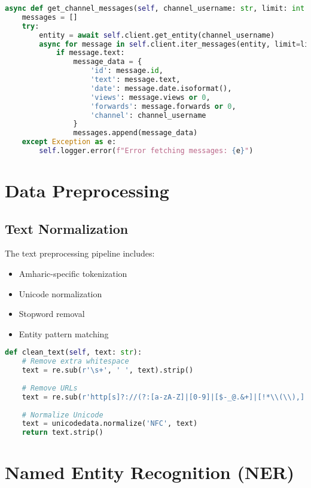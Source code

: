 \documentclass[12pt,a4paper]{article}
\begin{document}
\begin{lstlisting}[language=Python, caption=Telegram Scraper Implementation]
async def get_channel_messages(self, channel_username: str, limit: int = 1000):
    messages = []
    try:
        entity = await self.client.get_entity(channel_username)
        async for message in self.client.iter_messages(entity, limit=limit):
            if message.text:
                message_data = {
                    'id': message.id,
                    'text': message.text,
                    'date': message.date.isoformat(),
                    'views': message.views or 0,
                    'forwards': message.forwards or 0,
                    'channel': channel_username
                }
                messages.append(message_data)
    except Exception as e:
        self.logger.error(f"Error fetching messages: {e}")
\end{lstlisting}

\section{Data Preprocessing}

\subsection{Text Normalization}
The text preprocessing pipeline includes:
\begin{itemize}
    \item Amharic-specific tokenization
    \item Unicode normalization
    \item Stopword removal
    \item Entity pattern matching
\end{itemize}

\begin{lstlisting}[language=Python, caption=Text Preprocessing]
def clean_text(self, text: str):
    # Remove extra whitespace
    text = re.sub(r'\s+', ' ', text).strip()
    
    # Remove URLs
    text = re.sub(r'http[s]?://(?:[a-zA-Z]|[0-9]|[$-_@.&+]|[!*\\(\\),]|(?:%[0-9a-fA-F][0-9a-fA-F]))+', '', text)
    
    # Normalize Unicode
    text = unicodedata.normalize('NFC', text)
    return text.strip()
\end{lstlisting}

\section{Named Entity Recognition (NER)}
\end{document}
